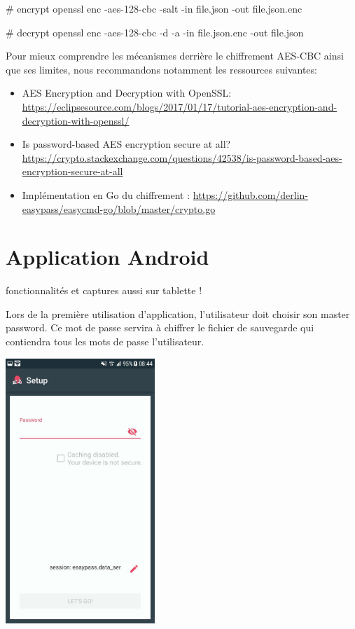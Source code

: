 \begin{bashcode}
# encrypt
openssl enc -aes-128-cbc -salt -in file.json -out file.json.enc  

# decrypt
openssl enc -aes-128-cbc -d -a -in file.json.enc -out file.json 
\end{bashcode}


Pour mieux comprendre les mécanismes derrière le chiffrement AES-CBC ainsi que ses limites, nous recommandons notamment les ressources suivantes:

\begin{itemize}
    \item AES Encryption and Decryption with OpenSSL: \url{https://eclipsesource.com/blogs/2017/01/17/tutorial-aes-encryption-and-decryption-with-openssl/}
    \item Is password-based AES encryption secure at all? \url{https://crypto.stackexchange.com/questions/42538/is-password-based-aes-encryption-secure-at-all}
    \item Implémentation en Go du chiffrement \easypass{}: \url{https://github.com/derlin-easypass/easycmd-go/blob/master/crypto.go}
\end{itemize}

\section{Application Android}

fonctionnalités et captures aussi sur tablette !

Lors de la première utilisation d'application, l'utilisateur doit choisir son master password. Ce mot de passe servira à chiffrer le fichier de sauvegarde qui contiendra tous les mots de passe l'utilisateur.

\includegraphics[height=10cm]{login.jpg}

